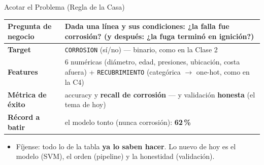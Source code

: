 \documentclass[aspectratio=169, 11pt]{beamer}
\begin{document}
\begin{frame}[shrink=8]{Acotar el Problema (Regla de la Casa)}
  \vspace{-4pt}
  {\footnotesize
  \begin{tabular}{@{}p{3.6cm}p{10.2cm}@{}}
    \toprule
    {\color{arcaDark}\bfseries Pregunta de negocio} &
      Dada una línea y sus condiciones: ¿la falla fue \textbf{corrosión}?
      (y después: ¿la fuga terminó en \textbf{ignición}?) \\
    \midrule
    {\color{arcaDark}\bfseries Target} &
      \texttt{CORROSION} (sí/no) --- binario, como en la Clase 2 \\
    \midrule
    {\color{arcaDark}\bfseries Features} &
      6 numéricas (diámetro, edad, presiones, ubicación, costa afuera)
      + \texttt{RECUBRIMIENTO} (categórica \(\to\) one-hot, como en la C4) \\
    \midrule
    {\color{arcaDark}\bfseries Métrica de éxito} &
      accuracy y \textbf{recall de corrosión} --- y validación \textbf{honesta}
      (el tema de hoy) \\
    \midrule
    {\color{arcaDark}\bfseries Récord a batir} &
      el modelo tonto (nunca corrosión): \textbf{62\,\%} \\
    \bottomrule
  \end{tabular}
  }

  \vspace{8pt}
  {\footnotesize\color{textMuted}
  \begin{itemize}\setlength{\itemsep}{3pt}
    \item[{\color{codeGreen}\scriptsize\faCheck}]
      Fíjense: todo lo de la tabla \textbf{ya lo saben hacer}. Lo nuevo de hoy
      es el modelo (SVM), el orden (pipeline) y la honestidad (validación).
  \end{itemize}
  }
\end{frame}
\end{document}
